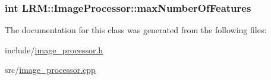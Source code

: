 \hypertarget{classLRM_1_1ImageProcessor_afcdba0a2c3377e8d89d8abb42632bf3a}{
\subsubsection[{max\-Number\-Of\-Features}]{\setlength{\rightskip}{0pt plus 5cm}int {\bf \-L\-R\-M\-::\-Image\-Processor\-::max\-Number\-Of\-Features}}}\label{classLRM_1_1ImageProcessor_afcdba0a2c3377e8d89d8abb42632bf3a}


\-The documentation for this class was generated from the following files\-:\begin{DoxyCompactItemize}
\item 
include/\hyperlink{image__processor_8h}{image\-\_\-processor.\-h}\item 
src/\hyperlink{image__processor_8cpp}{image\-\_\-processor.\-cpp}\end{DoxyCompactItemize}
